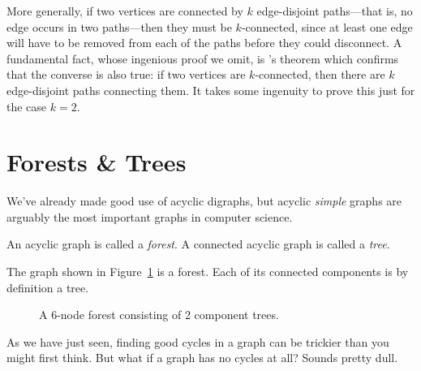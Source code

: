 More generally, if two vertices are connected by $k$ edge-disjoint
paths---that is, no edge occurs in two paths---then they must
be $k$-connected, since at least one edge will have to be removed from
each of the paths before they could disconnect.  A fundamental fact,
whose ingenious proof we omit, is 's theorem which
confirms that the converse is also true: if two vertices are
$k$-connected, then there are $k$ edge-disjoint paths connecting them.
It takes some ingenuity to prove this just for the case $k=2$.

\begin{problems}
\classproblems
{}

\homeworkproblems
{}

\examproblems
{}
\end{problems}

\section{Forests \& Trees}\label{trees-sec}

We've already made good use of acyclic digraphs, but acyclic
\emph{simple} graphs are arguably the most important graphs in
computer science.

\begin{definition}\label{def:tree}
An acyclic graph is called a \emph{forest}.  A connected acyclic graph
is called a \emph{tree}.
\end{definition}

The graph shown in Figure~\ref{fig:5I} is a forest.  Each of its
connected components is by definition a tree.

\begin{figure}
\caption{A 6-node forest consisting of 2 component trees.}
\label{fig:5I}
\end{figure}

\iffalse
As we have just seen, finding good cycles in a graph can be trickier than
you might first think.  But what if a graph has no cycles at all?  Sounds
pretty dull.

